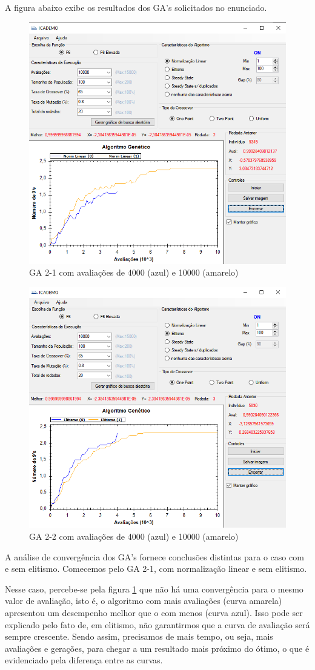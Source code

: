 \documentclass[12pt]{article}
\begin{document}
A figura abaixo exibe os resultados dos GA's solicitados no enunciado.

\begin{figure}[H]
	\centering
	\includegraphics[width=0.7\linewidth]{Imagens/questao5_1}
	\caption{GA 2-1 com avaliações de 4000 (azul) e 10000 (amarelo)}
	\label{fig:questao51}
\end{figure}

\begin{figure}[H]
	\centering
	\includegraphics[width=0.7\linewidth]{Imagens/questao5_2}
	\caption{GA 2-2 com avaliações de 4000 (azul) e 10000 (amarelo)}
	\label{fig:questao52}
\end{figure}

A análise de convergência dos GA's fornece conclusões distintas para o caso com e sem elitismo. Comecemos pelo GA 2-1, com normalização linear e sem elitismo.

Nesse caso, percebe-se pela figura \ref{fig:questao51} que não há uma convergência para o mesmo valor de avaliação, isto é, o algoritmo com mais avaliações (curva amarela) apresentou um desempenho melhor que o com menos (curva azul). Isso pode ser explicado pelo fato de, em elitismo, não garantirmos que a curva de avaliação será sempre crescente. Sendo assim, precisamos de mais tempo, ou seja, mais avaliações e gerações, para chegar a um resultado mais próximo do ótimo, o que é evidenciado pela diferença entre as curvas.
\end{document}
